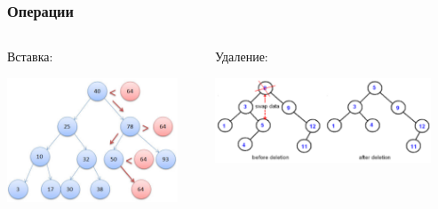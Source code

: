 \documentclass[xetex,mathserif,serif]{beamer}
\begin{document}
	\begin{frame}
		\frametitle{Операции}
		\begin{columns}
			\begin{column}{0.5\textwidth}
				Вставка:

				\includegraphics[width=0.9\textwidth]{bstInsertion.png}
			\end{column}
			\begin{column}{0.5\textwidth}
				Удаление:

				\includegraphics[width=0.9\textwidth]{bstRemoval.png}
			\end{column}
		\end{columns}
	\end{frame}
\end{document}

